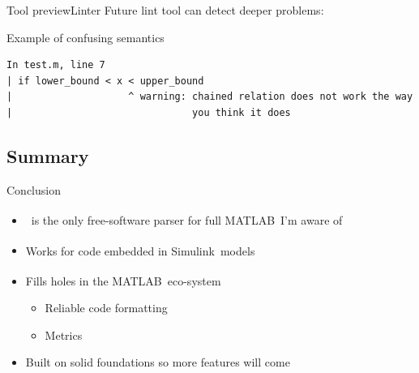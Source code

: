 \documentclass{beamer}
\newcommand{\mh}[0]{{\sc\structure{Miss\_Hit}}}
\newcommand{\matlab}[0]{MATLAB\textsuperscript{\tiny\textregistered}}
\newcommand{\simulink}[0]{Simulink\textsuperscript{\tiny\textregistered}}
\begin{document}
\begin{frame}[fragile]{Tool preview}{Linter}
  Future lint tool can detect deeper problems:
  \begin{block}{Example of confusing semantics}
    \scriptsize
\begin{verbatim}
In test.m, line 7
| if lower_bound < x < upper_bound
|                    ^ warning: chained relation does not work the way
|                               you think it does
\end{verbatim}
  \end{block}
\end{frame}

\subsection{Summary}
\begin{frame}{Conclusion}
  \begin{itemize}
  \item \mh~is the only free-software parser for full \matlab\ I'm
    aware of
  \item Works for code embedded in \simulink\ models
  \item Fills holes in the \matlab\ eco-system
    \begin{itemize}
    \item Reliable code formatting
    \item Metrics
    \end{itemize}
  \item Built on solid foundations so more features will come
  \end{itemize}

  \vspace{12pt}

\end{frame}
\end{document}
